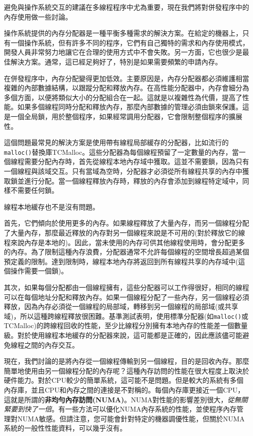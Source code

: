 避免與操作系統交互的建議在多線程程序中尤為重要，現在我們將對併發程序中的內存使用做一些討論。


操作系統提供的內存分配器是一種平衡多種需求的解決方案。在給定的機器上，只有一個操作系統，但有許多不同的程序，它們有自己獨特的需求和內存使用模式，開發人員非常努力地讓它在合理的使用方式中不會失敗。另一方面，它也很少是最佳解決方案。通常，這已經足夠好了，特別是如果需要頻繁的申請內存。

在併發程序中，內存分配變得更加低效。主要原因是，內存分配器都必須維護相當複雜的內部數據結構，以跟蹤分配和釋放內存。在高性能分配器中，內存會細分為多個方面，以便將類似大小的分配組合在一起。這就是以複雜性為代價，提高了性能。如果多個線程同時分配和釋放內存，那麼內部數據的管理必須由鎖來保護。這是一個全局鎖，用於整個程序，如果經常調用分配器，它會限制整個程序的擴展性。

這個問題最常見的解決方案是使用帶有線程局部緩存的分配器，比如流行的\texttt{malloc()}替換庫TCMalloc。這些分配器為每個線程預留了一定數量的內存，當一個線程需要分配內存時，首先從線程本地內存域中獲取。這並不需要鎖，因為只有一個線程與該域交互。只有當域為空時，分配器才必須從所有線程共享的內存中獲取鎖並進行分配。當一個線程釋放內存時，釋放的內存會添加到線程特定域中，同樣不需要任何鎖。

線程本地緩存也不是沒有問題。

首先，它們傾向於使用更多的內存。如果線程釋放了大量內存，而另一個線程分配了大量內存，那麼最近釋放的內存對另一個線程來說是不可用的(對於釋放它的線程來說內存是本地的)。因此，當未使用的內存可供其他線程使用時，會分配更多的內存。為了限制這種內存浪費，分配器通常不允許每個線程的空間增長超過某個預定義的限制。達到限制時，線程本地內存將返回到所有線程共享的內存域中(這個操作需要一個鎖)。

其次，如果每個分配都由一個線程擁有，這些分配器可以工作得很好，相同的線程可以在每個地址分配和釋放內存。如果一個線程分配了一些內存，另一個線程必須釋放，因為內存必須從一個線程的局部域，轉移到另一個線程的局部域(或共享域)，所以這種跨線程釋放很困難。基準測試表明，使用標準分配器(如\texttt{malloc()}或TCMalloc)的跨線程回收的性能，至少比線程分別擁有本地內存的性能差一個數量級。對於使用線程本地緩存的分配器來說，這可能都是正確的，因此應該儘可能避免線程之間的內存交互。

現在，我們討論的是將內存從一個線程傳輸到另一個線程，目的是回收內存。那麼簡單地使用由另一個線程分配的內存呢？這種內存訪問的性能在很大程度上取決於硬件能力。對於CPU較少的簡單系統，這可能不是問題。但是較大的系統有多個內存庫，並且CPU和內存之間的連接是不對稱的。每個內存庫更接近一個CPU，這就是所謂的\textbf{非均勻內存訪問(NUMA)}。NUMA對性能的影響差別很大，\textit{從無關緊要到快了一倍}。有一些方法可以優化NUMA內存系統的性能，並使程序內存管理對NUMA敏感。但請注意，您可能會針對特定的機器調優性能，但關於NUMA系統的一般性性能資料，可以幾乎沒有。


